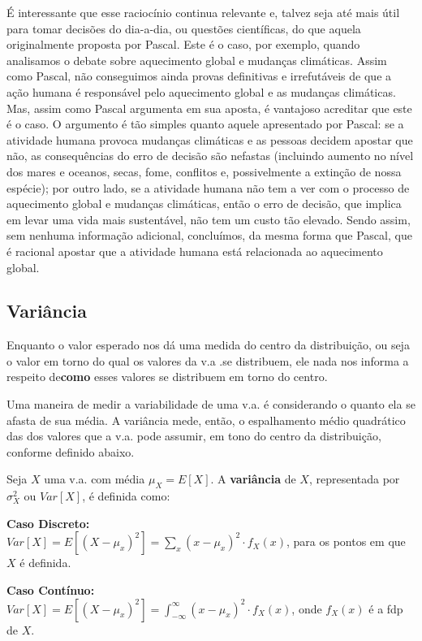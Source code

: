 \documentclass[
]{book}
\theoremstyle{definition}
\theoremstyle{definition}
\theoremstyle{definition}
\theoremstyle{remark}
\begin{document}
É interessante que esse raciocínio continua relevante e, talvez seja até mais útil para tomar decisões do dia-a-dia, ou questões científicas, do que aquela originalmente proposta por Pascal. Este é o caso, por exemplo, quando analisamos o debate sobre aquecimento global e mudanças climáticas. Assim como Pascal, não conseguimos ainda provas definitivas e irrefutáveis de que a ação humana é responsável pelo aquecimento global e as mudanças climáticas. Mas, assim como Pascal argumenta em sua aposta, é vantajoso acreditar que este é o caso. O argumento é tão simples quanto aquele apresentado por Pascal: se a atividade humana provoca mudanças climáticas e as pessoas decidem apostar que não, as consequências do erro de decisão são nefastas (incluindo aumento no nível dos mares e oceanos, secas, fome, conflitos e, possivelmente a extinção de nossa espécie); por outro lado, se a atividade humana não tem a ver com o processo de aquecimento global e mudanças climáticas, então o erro de decisão, que implica em levar uma vida mais sustentável, não tem um custo tão elevado. Sendo assim, sem nenhuma informação adicional, concluímos, da mesma forma que Pascal, que é racional apostar que a atividade humana está relacionada ao aquecimento global.

\hypertarget{variuxe2ncia}{%
\subsection*{Variância}\label{variuxe2ncia}}

Enquanto o valor esperado nos dá uma medida do centro da distribuição, ou seja o valor em torno do qual os valores da v.a .se distribuem, ele nada nos informa a respeito de\textbf{como} esses valores se distribuem em torno do centro.

Uma maneira de medir a variabilidade de uma v.a. é considerando o quanto ela se afasta de sua média. A variância mede, então, o espalhamento médio quadrático das dos valores que a v.a. pode assumir, em tono do centro da distribuição, conforme definido abaixo.

Seja \(X\) uma v.a. com média \({\mu_X = E[X]}\). A \textbf{variância} de \(X\), representada por \({\sigma_X^2}\) ou \({Var[X]}\), é definida como:

\textbf{Caso Discreto:}\\
\({Var[X] = E[(X-\mu_x)^2] = \sum_x (x-\mu_x)^2 \cdot f_X(x)}\), para os pontos em que \(X\) é definida.

\textbf{Caso Contínuo:}\\
\({Var[X] = E[(X-\mu_x)^2] = \int_{-\infty}^{\infty} (x-\mu_x)^2 \cdot f_X(x)}\), onde \(f_X(x)\) é a fdp de \(X\).
\end{document}
